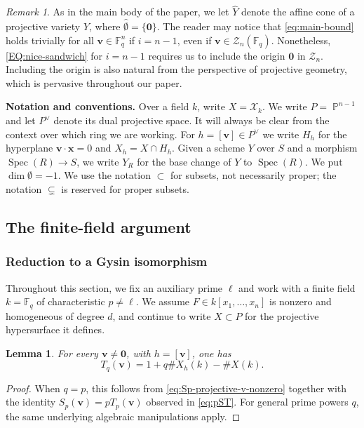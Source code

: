 \documentclass[a4paper,11pt, twoside,reqno]{amsart}
\theoremstyle{plain}
\newtheorem{lemma}[thm]{Lemma}
\theoremstyle{definition}
\theoremstyle{remark}
\newtheorem{rem}[thm]{Remark}
\newcommand{\bfv}{\bm{v}}
\newcommand{\bfx}{\bm{x}}
\DeclareMathOperator{\PP}{\mathbb{P}}
\DeclareMathOperator{\Spec}{Spec}
\newcommand{\FF}{\mathbb{F}}
\newcommand{\cone}{\widehat}
\numberwithin{equation}{section}
\begin{document}
\begin{rem}
As in the main body of the paper,
we let $\cone Y$ denote the affine cone of a projective variety $Y$,
where $\cone \emptyset = \{\bm0\}$.
The reader may notice that \eqref{eq:main-bound} holds
trivially for all $\bfv\in \FF_q^n$ if $i=n-1$, even if $\bfv\in \mathcal Z_n(\FF_q)$.
Nonetheless, \eqref{EQ:nice-sandwich} for $i=n-1$ requires us to include the origin
$\bm0$ in $\mathcal Z_n$.
Including the origin
is also natural from the perspective of projective geometry,
which is pervasive throughout our paper.
\end{rem}

\noindent \textbf{Notation and conventions.} 
Over a field $k$, write $X=\mathcal X_k$. We write $P=\PP^{n-1}$ and let $P^\vee$ denote its dual projective space. It will always be clear from the context over which ring we are working. For $h=[\bfv]\in P^\vee$ we write $H_h$ for the
hyperplane $\bfv\cdot\bfx=0$ and $X_h=X\cap H_h$. Given a scheme $Y$ over $S$ and a morphism $\Spec(R) \to S$, we write $Y_R$ for the base change of $Y$ to $\Spec(R)$.
We put $\dim\emptyset=-1$.
We use the notation $\subset$ for subsets,
not necessarily proper;
the notation $\subsetneq$ is reserved for proper subsets.

\subsection{The finite-field argument}

\subsubsection{Reduction to a Gysin isomorphism}
Throughout this section, we fix an auxiliary prime $\ell$ and work with a finite field $k=\FF_q$ of characteristic $p\neq \ell$.
We assume $F \in k[x_1,\dots, x_n]$ is nonzero and homogeneous of degree $d$,
and continue to write $X\subset P$ for the projective hypersurface it defines.
\begin{lemma}\label{app:ss:lem:homogeneity}
For every $\bfv\neq\bm0$, with $h=[\bfv]$, one has
\begin{equation*}
 T_q(\bfv)=1+q\#X_h(k)-\#X(k).
\end{equation*}
\end{lemma}
\begin{proof}
When $q=p$, this follows from
\eqref{eq:Sp-projective-v-nonzero}
together with the identity $S_p(\bfv) = pT_p(\bfv)$
observed in \eqref{eq:pST}.
For general prime powers $q$, the same underlying algebraic manipulations apply.
\end{proof}
\end{document}
